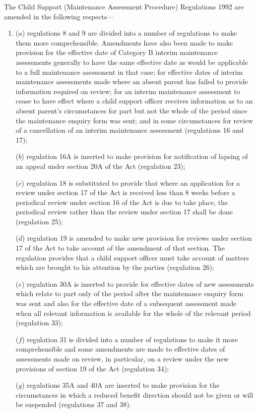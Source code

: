 \documentclass[a4paper]{article}
\begin{document}
 The Child Support (Maintenance Assessment Procedure) Regulations 1992 are amended in the following respects—
\begin{enumerate}\item[]
 ($a$) regulations 8 and 9 are divided into a number of regulations to make them more comprehensible. Amendments have also been made to make provision for the effective date of Category B interim maintenance assessments generally to have the same effective date as would be applicable to a full maintenance assessment in that case; for effective dates of interim maintenance assessments made where an absent parent has failed to provide information required on review; for an interim maintenance assessment to cease to have effect where a child support officer receives information as to an absent parent’s circumstances for part but not the whole of the period since the maintenance enquiry form was sent; and in some circumstances for review of a cancellation of an interim maintenance assessment (regulations 16 and 17);

 ($b$) regulation 16A is inserted to make provision for notification of lapsing of an appeal under section 20A of the Act (regulation 23);

 ($c$) regulation 18 is substituted to provide that where an application for a review under section 17 of the Act is received less than 8 weeks before a periodical review under section 16 of the Act is due to take place, the periodical review rather than the review under section 17 shall be done (regulation 25);

 ($d$) regulation 19 is amended to make new provision for reviews under section 17 of the Act to take account of the amendment of that section. The regulation provides that a child support officer must take account of matters which are brought to his attention by the parties (regulation 26);

 ($e$) regulation 30A is inserted to provide for effective dates of new assessments which relate to part only of the period after the maintenance enquiry form was sent and also for the effective date of a subsequent assessment made when all relevant information is available for the whole of the relevant period (regulation 33);

 ($f$) regulation 31 is divided into a number of regulations to make it more comprehensible and some amendments are made to effective dates of assessments made on review, in particular, on a review under the new provisions of section 19 of the Act (regulation 34);

 ($g$) regulations 35A and 40A are inserted to make provision for the circumstances in which a reduced benefit direction should not be given or will be suspended (regulations 37 and 38).
\end{enumerate}
\end{document}
